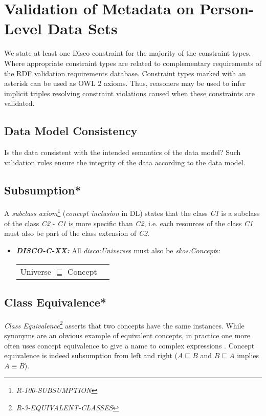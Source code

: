 \documentclass{llncs}
\newenvironment{DL}{
  \vspace{0cm}
  \begin{tabular}{r l}

}{
  \end{tabular}
}
\begin{document}
\section{Validation of Metadata on Person-Level Data Sets}

We state at least one Disco constraint for the majority of the constraint types.
Where appropriate constraint types are related to complementary requirements of the RDF validation requirements database.
Constraint types marked with an asterisk can be used as OWL 2 axioms.
Thus, reasoners may be used to infer implicit triples resolving constraint violations caused when these constraints are validated.

\subsection{Data Model Consistency}

Is the data consistent with the intended semantics of the data model?
Such validation rules ensure the integrity of the data according to the data model.

\subsection{Subsumption*}

A \emph{subclass axiom}\footnote{{\em R-100-SUBSUMPTION}} ({\em concept inclusion} in DL) states that the class \emph{C1} is a subclass of the class \emph{C2} - \emph{C1} is more specific than \emph{C2}, 
i.e. each resources of the class \emph{C1} must also be part of the class extension of \emph{C2}.

\begin{itemize}
	\item \textbf{{\em DISCO-C-XX:}} 
All {\em disco:Universe}s must also be {\em skos:Concept}s:

\begin{DL}
Universe $\sqsubseteq$ Concept
\end{DL}
\end{itemize}

\subsection{Class Equivalence*}

{\em Class Equivalence}\footnote{{\em R-3-EQUIVALENT-CLASSES}} asserts that two concepts have the same instances.
While synonyms are an obvious example of equivalent concepts, in practice one more
often uses concept equivalence to give a name to complex expressions \cite{Kroetzsch2012}.
Concept equivalence is indeed subsumption from left and right ($A \sqsubseteq B$ and $B \sqsubseteq A$ implies $A \equiv B$).
\end{document}
